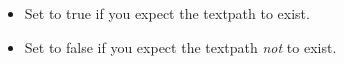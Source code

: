 \begin{itemize}
\item Set to true if you expect the textpath to exist.
\item Set to false if you expect the textpath \emph{not} to exist.
\end{itemize}
